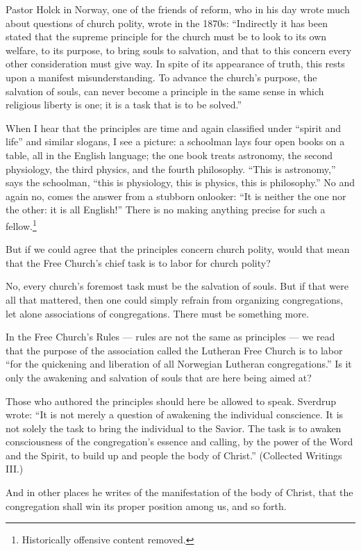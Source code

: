 Pastor Holck in Norway, one of the friends of reform, who in his day wrote much about questions of church polity, wrote in the 1870s: “Indirectly it has been stated that the supreme principle for the church must be to look to its own welfare, to its purpose, to bring souls to salvation, and that to this concern every other consideration must give way. In spite of its appearance of truth, this rests upon a manifest misunderstanding. To advance the church’s purpose, the salvation of souls, can never become a principle in the same sense in which religious liberty is one; it is a task that is to be solved.”

When I hear that the principles are time and again classified under “spirit and life” and similar slogans, I see a picture: a schoolman lays four open books on a table, all in the English language; the one book treats astronomy, the second physiology, the third physics, and the fourth philosophy. “This is astronomy,” says the schoolman, “this is physiology, this is physics, this is philosophy.” No and again no, comes the answer from a stubborn onlooker: “It is neither the one nor the other: it is all English!” There is no making anything precise for such a fellow.\footnote{Historically offensive content removed.}

But if we could agree that the principles concern church polity, would that mean that the Free Church’s chief task is to labor for church polity?

No, every church’s foremost task must be the salvation of souls. But if that were all that mattered, then one could simply refrain from organizing congregations, let alone associations of congregations. There must be something more.

In the Free Church’s Rules — rules are not the same as principles — we read that the purpose of the association called the Lutheran Free Church is to labor “for the quickening and liberation of all Norwegian Lutheran congregations.” Is it only the awakening and salvation of souls that are here being aimed at?

Those who authored the principles should here be allowed to speak. Sverdrup wrote: “It is not merely a question of awakening the individual conscience. It is not solely the task to bring the individual to the Savior. The task is to awaken consciousness of the congregation’s essence and calling, by the power of the Word and the Spirit, to build up and people the body of Christ.” (Collected Writings III.)

And in other places he writes of the manifestation of the body of Christ, that the congregation shall win its proper position among us, and so forth.

